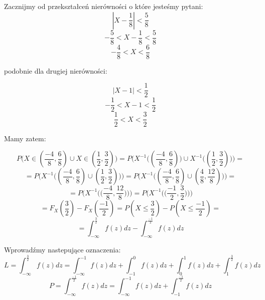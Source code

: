 \documentclass{article}
\begin{document}
Zacznijmy od przekształceń nierówności o które jesteśmy pytani:
\begin{equation*}
    |X - \frac{1}{8}| < \frac{5}{8}
\end{equation*}
\begin{equation*}
    -\frac{5}{8} < X - \frac{1}{8} < \frac{5}{8}
\end{equation*}
\begin{equation*}
    -\frac{4}{8} < X  < \frac{6}{8}
\end{equation*}

podobnie dla drugiej nierówności:

\begin{equation*}
    |X - 1| < \frac{1}{2}
\end{equation*}
\begin{equation*}
    -\frac{1}{2} < X - 1 < \frac{1}{2}
\end{equation*}
\begin{equation*}
    \frac{1}{2} < X  < \frac{3}{2}
\end{equation*}

Mamy zatem:

\begin{equation*}
    P\Big(X \in (\frac{-4}{8}, \frac{6}{8}) \cup X \in (\frac{1}{2}, \frac{3}{2})\Big) 
    = P\Big(X^{-1}\Big((\frac{-4}{8}, \frac{6}{8})\Big) \cup X^{-1}\Big((\frac{1}{2}, \frac{3}{2})\Big)\Big)
    =
\end{equation*}
\begin{equation*}
    = P\Bigg(X^{-1}\Big((\frac{-4}{8}, \frac{6}{8}) \cup (\frac{1}{2}, \frac{3}{2})\Big)\Bigg)
    = P\Bigg(X^{-1}\Big((\frac{-4}{8}, \frac{6}{8}) \cup (\frac{4}{8}, \frac{12}{8})\Big)\Bigg) =
\end{equation*}
\begin{equation*}
    = P\Bigg(X^{-1}\Bigg(\Big(\frac{-4}{8}, \frac{12}{8}\Big)\Bigg)\Bigg) = P\Bigg(X^{-1}\Bigg(\Big(\frac{-1}{2}, \frac{3}{2}\Big)\Bigg)\Bigg)
\end{equation*}
\begin{equation*}
    = F_{X}(\frac{3}{2}) - F_{X}(\frac{-1}{2}) = P(X \leq \frac{3}{2}) - P(X \leq \frac{-1}{2}) =
\end{equation*}
\begin{equation*}
    = \int_{- \infty}^{\frac{3}{2}} f(z) dz - \int_{- \infty}^{\frac{-1}{2}} f(z) dz 
\end{equation*}

Wprowadźmy nastepujące oznaczenia:
\begin{equation*}
    L = \int_{- \infty}^{\frac{3}{2}} f(z) dz = \int_{- \infty}^{-1} f(z) dz + \int_{-1}^{0} f(z) dz + \int_{0}^{1} f(z) dz + \int_{1}^{\frac{3}{2}} f(z) dz
\end{equation*}
\begin{equation*}
    P = \int_{- \infty}^{\frac{-1}{2}} f(z) dz = \int_{- \infty}^{-1} f(z) dz + \int_{-1}^{\frac{-1}{2}} f(z) dz
\end{equation*}
\end{document}
